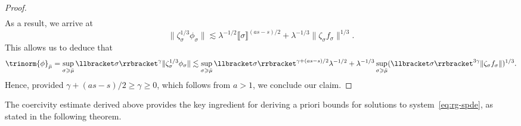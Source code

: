 \documentclass{article}
\numberwithin{equation}{section}
\theoremstyle{plain}
\theoremstyle{definition}
\begin{document}
\begin{proof}
\[\begin{aligned}
     \end{aligned} \]
  As a result, we arrive at
  \[ \| \zeta_{\sigma}^{1 / 3} \phi_{\sigma} \| \lesssim \lambda^{- 1 / 2}
     \llbracket \sigma \rrbracket^{(a s - s) / 2} + \lambda^{- 1 / 3} \|
     \zeta_{\sigma} f_{\sigma} \|^{1 / 3}  . \]
  This allows us to deduce that
  \[ \trinorm{ \phi }_{\bar{\mu}} = \sup_{\sigma \geqslant
     \bar{\mu}}  \llbracket \sigma \rrbracket^{\gamma} \| \zeta_{\sigma}^{1 /
     3} \phi_{\sigma} \| \lesssim \sup_{\sigma \geqslant \bar{\mu}} 
     \llbracket \sigma \rrbracket^{\gamma + (a s - s) / 2} \lambda^{- 1 / 2} +
     \lambda^{- 1 / 3} \sup_{\sigma \geqslant \bar{\mu}}  (\llbracket \sigma
     \rrbracket^{3 \gamma}  \| \zeta_{\sigma} f_{\sigma} \|)^{1 / 3}  . \]
  Hence, provided $\gamma + (a s - s) / 2 \geqslant \gamma \geqslant 0$, which
  follows from $a > 1$, we conclude our claim.
\end{proof}

The coercivity estimate derived above provides the key ingredient for deriving
a priori bounds for solutions to system~\eqref{eq:rg-spde}, as stated in the
following theorem.
\end{document}
